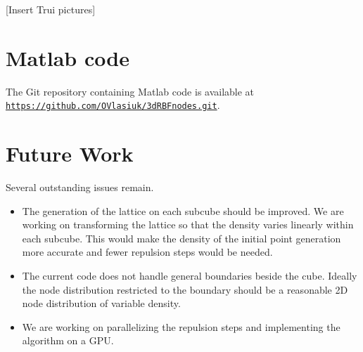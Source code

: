 \documentclass[10pt]{amsart}
\begin{document}
[Insert Trui pictures]



\section{Matlab code}

The Git repository containing Matlab code is available at \texttt{\url{https://github.com/OVlasiuk/3dRBFnodes.git}}.

\section{Future Work}

Several outstanding issues remain. 
\begin{itemize}
\item The generation of the lattice on each subcube should be improved. We are working on transforming the lattice so that the density varies linearly within each subcube. This would make the density of the initial point generation more accurate and fewer repulsion steps would be needed.
\item The current code does not handle general boundaries beside the cube. Ideally the node distribution restricted to the boundary should be a reasonable 2D node distribution of variable density.
\item We are working on parallelizing the repulsion steps and implementing the algorithm on a GPU.
\end{itemize}
\end{document}
